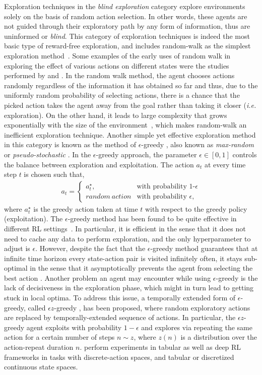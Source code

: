 \label{sec:Random}
Exploration techniques in the \emph{blind exploration} category explore environments solely on the basis of random action selection. In other words, these agents are not guided through their exploratory path by any form of information, thus are uninformed or \emph{blind}. This category of exploration techniques is indeed the most basic type of reward-free exploration, and includes random-walk as the simplest exploration method~. Some examples of the early uses of random walk in exploring the effect of various actions on different states were the studies performed by  and . In the random walk method, the agent chooses actions randomly regardless of the information it has obtained so far and thus, due to the uniformly random probability of selecting actions, there is a chance that the picked action takes the agent away from the goal rather than taking it closer (\emph{i.e.} exploration). On the other hand, it leads to large complexity that grows exponentially with the size of the environment~, which makes random-walk an inefficient exploration technique.
Another simple yet effective exploration method in this category is known as the method of $\epsilon$-greedy , also known as \emph{max-random} or \emph{pseudo-stochastic} . In the $\epsilon$-greedy approach, the parameter $\epsilon\in\left[0,1\right]$ controls the balance between exploration and exploitation. The action $a_t$ at every time step $t$ is chosen such that,
\begin{align}
a_t=\begin{cases}
a_t^\star,& \text{with probability 1-$\epsilon$} \\
random~action &\text{with probability $\epsilon$},
\end{cases}
\end{align}
where $a_t^\star$ is the greedy action taken at time $t$ with respect to the greedy policy (exploitation).
The $\epsilon$-greedy method has been found to be quite effective in different RL settings~. In particular, it is efficient in the sense that it does not need to cache any data to perform exploration, and the only hyperparameter to adjust is $\epsilon$. However, despite the fact that the $\epsilon$-greedy method guarantees that at infinite time horizon every state-action pair is visited infinitely often, it stays sub-optimal in the sense that it asymptotically prevents the agent from selecting the best action . Another problem an agent may encounter while using $\epsilon$-greedy is the lack of decisiveness in the exploration phase, which might in turn lead to getting stuck in local optima. To address this issue, a temporally extended form of $\epsilon$-greedy, called $\epsilon z$-greedy , has been proposed, where random exploratory actions are replaced by temporally-extended sequence of actions. In particular, the $\epsilon z$-greedy agent exploits with probability $1-\epsilon$ and explores via repeating the same action for a certain number of steps $n\sim z$, where $z(n)$ is a distribution over the action-repeat duration $n$.  perform experiments in tabular as well as deep RL frameworks in tasks with discrete-action spaces, and tabular or discretized continuous state spaces.
